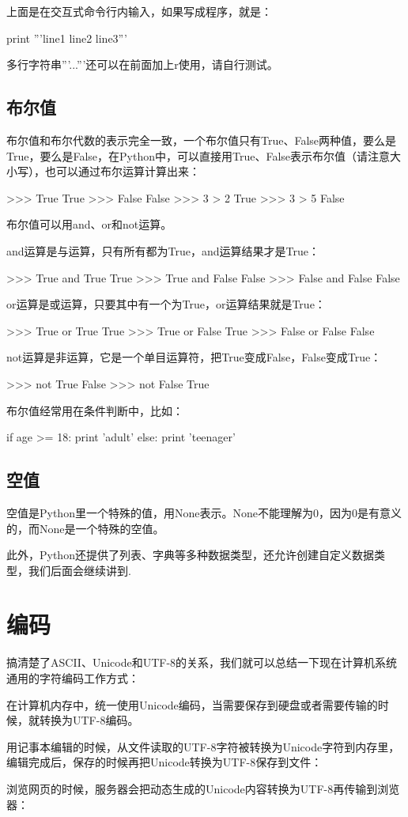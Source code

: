 上面是在交互式命令行内输入，如果写成程序，就是：

print '''line1
line2
line3'''

多行字符串'''...'''还可以在前面加上r使用，请自行测试。
\section{布尔值}
布尔值和布尔代数的表示完全一致，一个布尔值只有True、False两种值，要么是True，要么是False，在Python中，可以直接用True、False表示布尔值（请注意大小写），也可以通过布尔运算计算出来：

>>> True
True
>>> False
False
>>> 3 > 2
True
>>> 3 > 5
False

布尔值可以用and、or和not运算。

and运算是与运算，只有所有都为True，and运算结果才是True：

>>> True and True
True
>>> True and False
False
>>> False and False
False

or运算是或运算，只要其中有一个为True，or运算结果就是True：

>>> True or True
True
>>> True or False
True
>>> False or False
False

not运算是非运算，它是一个单目运算符，把True变成False，False变成True：

>>> not True
False
>>> not False
True

布尔值经常用在条件判断中，比如：

if age >= 18:
    print 'adult'
else:
    print 'teenager'
\section{空值}
空值是Python里一个特殊的值，用None表示。None不能理解为0，因为0是有意义的，而None是一个特殊的空值。

此外，Python还提供了列表、字典等多种数据类型，还允许创建自定义数据类型，我们后面会继续讲到.
\chapter{编码}
搞清楚了ASCII、Unicode和UTF-8的关系，我们就可以总结一下现在计算机系统通用的字符编码工作方式：

在计算机内存中，统一使用Unicode编码，当需要保存到硬盘或者需要传输的时候，就转换为UTF-8编码。

用记事本编辑的时候，从文件读取的UTF-8字符被转换为Unicode字符到内存里，编辑完成后，保存的时候再把Unicode转换为UTF-8保存到文件：

浏览网页的时候，服务器会把动态生成的Unicode内容转换为UTF-8再传输到浏览器：

